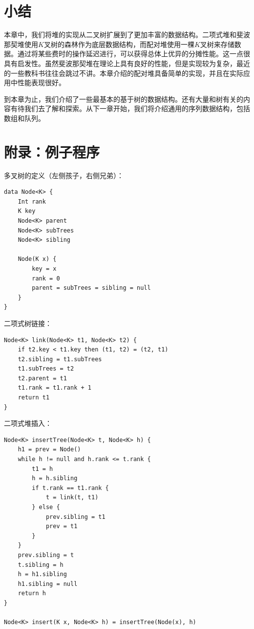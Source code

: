 \documentclass[b5paper]{ctexart}
\begin{document}
\section{小结}

本章中，我们将堆的实现从二叉树扩展到了更加丰富的数据结构。二项式堆和斐波那契堆使用$K$叉树的森林作为底层数据结构，而配对堆使用一棵$K$叉树来存储数据。通过将某些费时的操作延迟进行，可以获得总体上优异的分摊性能。这一点很具有启发性。虽然斐波那契堆在理论上具有良好的性能，但是实现较为复杂，最近的一些教科书往往会跳过不讲。本章介绍的配对堆具备简单的实现，并且在实际应用中性能表现很好。

到本章为止，我们介绍了一些最基本的基于树的数据结构。还有大量和树有关的内容有待我们去了解和探索。从下一章开始，我们将介绍通用的序列数据结构，包括数组和队列。

\section{附录：例子程序}

多叉树的定义（左侧孩子，右侧兄弟）：

\begin{lstlisting}[language = Bourbaki]
data Node<K> {
    Int rank
    K key
    Node<K> parent
    Node<K> subTrees
    Node<K> sibling

    Node(K x) {
        key = x
        rank = 0
        parent = subTrees = sibling = null
    }
}
\end{lstlisting}

二项式树链接：

\begin{lstlisting}[language = Bourbaki]
Node<K> link(Node<K> t1, Node<K> t2) {
    if t2.key < t1.key then (t1, t2) = (t2, t1)
    t2.sibling = t1.subTrees
    t1.subTrees = t2
    t2.parent = t1
    t1.rank = t1.rank + 1
    return t1
}
\end{lstlisting}

二项式堆插入：

\begin{lstlisting}[language = Bourbaki]
Node<K> insertTree(Node<K> t, Node<K> h) {
    h1 = prev = Node()
    while h != null and h.rank <= t.rank {
        t1 = h
        h = h.sibling
        if t.rank == t1.rank {
            t = link(t, t1)
        } else {
            prev.sibling = t1
            prev = t1
        }
    }
    prev.sibling = t
    t.sibling = h
    h = h1.sibling
    h1.sibling = null
    return h
}

Node<K> insert(K x, Node<K> h) = insertTree(Node(x), h)
\end{lstlisting}
\end{document}

